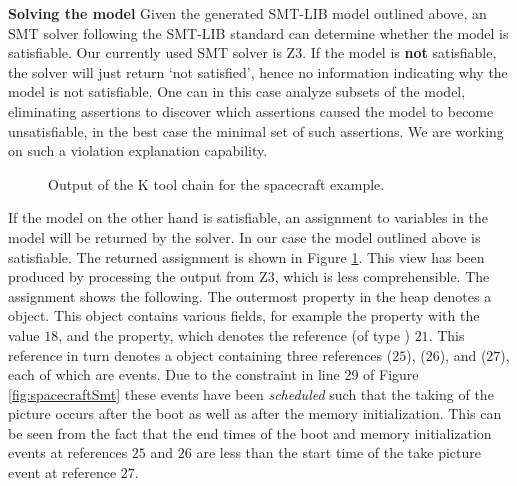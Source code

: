 \textbf{Solving the model} Given the generated SMT-LIB model outlined
above, an SMT solver following the SMT-LIB standard can determine
whether the model is satisfiable. Our currently used SMT solver is
Z3. If the model is {\bf not} satisfiable, the solver will just return
`not satisfied', hence no information indicating why the model is not
satisfiable. One can in this case analyze subsets of the model,
eliminating assertions to discover which assertions caused the model
to become unsatisfiable, in the best case the minimal set of such
assertions. We are working on such a violation explanation capability.

\begin{figure}
\caption{Output of the K tool chain for the spacecraft example.}
\label{fig:shapes}
\end{figure}

If the model on the other hand is satisfiable, an assignment to
variables in the model will be returned by the solver. In our case the
model outlined above is satisfiable. The returned assignment is shown
in Figure \ref{fig:shapes}. This view has been produced by processing
the output from Z3, which is less comprehensible.
%
The assignment shows the following. The outermost 
property in the heap denotes a  object.  This object
contains various fields, for example the  property with
the value $18$, and the  property, which denotes the
reference (of type ) $21$. This reference in turn denotes a
 object containing three references 
($25$),  ($26$), and  ($27$), each of
which are events. Due to the constraint in line 29 of Figure
\ref{fig:spacecraftSmt} these events have been {\em scheduled} such
that the taking of the picture occurs after the boot as well as after
the memory initialization.  This can be seen from the fact that the
end times of the boot and memory initialization events at references
$25$ and $26$ are less than the start time of the take picture event
at reference $27$.

\lstset{language=K}
